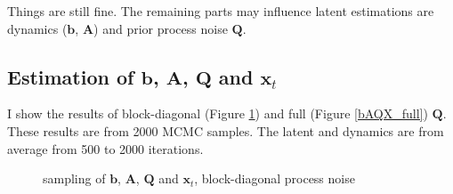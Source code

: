 \documentclass[]{article}
\begin{document}
Things are still fine. The remaining parts may influence latent estimations are dynamics (\(\mathbf{b}\), \(\mathbf{A}\)) and prior process noise \(\mathbf{Q}\).

\subsection{Estimation of \(\mathbf{b}\), \(\mathbf{A}\), \(\mathbf{Q}\) and \(\mathbf{x}_t\)}
I show the results of block-diagonal (Figure \ref{bAQX_blkDiag}) and full (Figure \ref{bAQX_full}) \(\mathbf{Q}\). These results are from 2000 MCMC samples. The latent and dynamics are from average from 500 to 2000 iterations.

\begin{figure}[h!]
	\caption{sampling of $\mathbf{b}$, $\mathbf{A}$, $\mathbf{Q}$ and $\mathbf{x}_t$, block-diagonal process noise}
	\label{bAQX_blkDiag}
\end{figure}
\end{document}
